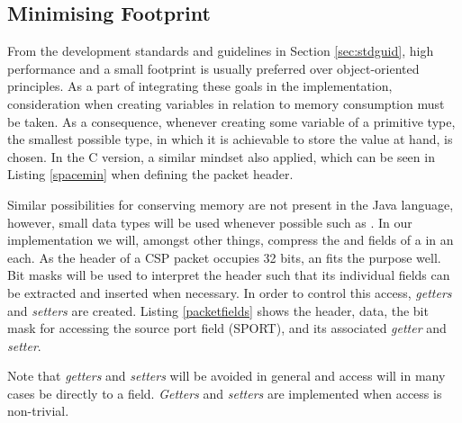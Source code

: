 \subsection{Minimising Footprint} %
\label{sub:minimizing_memory_footprint}
From the development standards and guidelines in Section \ref{sec:stdguid}, high performance and a small footprint is usually preferred over object-oriented principles. As a part of integrating these goals in the implementation, consideration when creating variables in relation to memory consumption must be taken. As a consequence, whenever creating some variable of a primitive type, the smallest possible type, in which it is achievable to store the value at hand, is chosen. In the C version, a similar mindset also applied, which can be seen in Listing \ref{spacemin} when defining the packet header.



Similar possibilities for conserving memory are not present in the Java language, however, small data types will be used whenever possible such as . In our implementation we will, amongst other things, compress the  and  fields of a  in an  each. As the header of a CSP packet occupies 32 bits, an  fits the purpose well. Bit masks will be used to interpret the header such that its individual fields can be extracted and inserted when necessary. In order to control this access, \textit{getters} and \textit{setters} are created. Listing \ref{packetfields} shows the header, data, the bit mask for accessing the source port field (SPORT), and its associated \textit{getter} and \textit{setter}.



Note that \textit{getters} and \textit{setters} will be avoided in general and access will in many cases be directly to a  field. \textit{Getters} and \textit{setters} are implemented when access is non-trivial.
